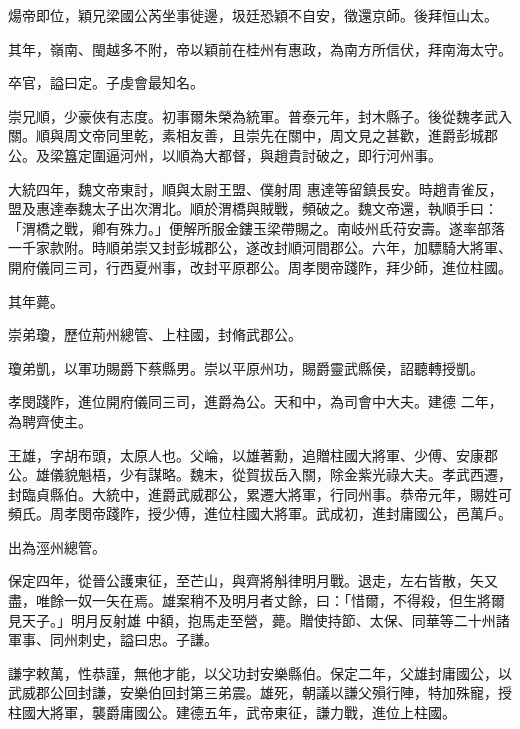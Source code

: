 \begin{pinyinscope}
 煬帝即位，穎兄梁國公芮坐事徙邊，圾廷恐穎不自安，徵還京師。後拜恒山太。



 其年，嶺南、閩越多不附，帝以穎前在桂州有惠政，為南方所信伏，拜南海太守。



 卒官，謚曰定。子虔會最知名。



 崇兄順，少豪俠有志度。初事爾朱榮為統軍。普泰元年，封木縣子。後從魏孝武入關。順與周文帝同里乾，素相友善，且崇先在關中，周文見之甚歡，進爵彭城郡公。及梁簋定圍逼河州，以順為大都督，與趙貴討破之，即行河州事。



 大統四年，魏文帝東討，順與太尉王盟、僕射周
 惠達等留鎮長安。時趙青雀反，盟及惠達奉魏太子出次渭北。順於渭橋與賊戰，頻破之。魏文帝還，執順手曰：「渭橋之戰，卿有殊力。」便解所服金鏤玉梁帶賜之。南岐州氐苻安壽。遂率部落一千家款附。時順弟崇又封彭城郡公，遂改封順河間郡公。六年，加驃騎大將軍、開府儀同三司，行西夏州事，改封平原郡公。周孝閔帝踐阼，拜少師，進位柱國。



 其年薨。



 崇弟瓊，歷位荊州總管、上柱國，封脩武郡公。



 瓊弟凱，以軍功賜爵下蔡縣男。崇以平原州功，賜爵靈武縣侯，詔聽轉授凱。



 孝閔踐阼，進位開府儀同三司，進爵為公。天和中，為司會中大夫。建德
 二年，為聘齊使主。



 王雄，字胡布頭，太原人也。父崘，以雄著勳，追贈柱國大將軍、少傅、安康郡公。雄儀貌魁梧，少有謀略。魏末，從賀拔岳入關，除金紫光祿大夫。孝武西遷，封臨貞縣伯。大統中，進爵武威郡公，累遷大將軍，行同州事。恭帝元年，賜姓可頻氏。周孝閔帝踐阼，授少傅，進位柱國大將軍。武成初，進封庸國公，邑萬戶。



 出為涇州總管。



 保定四年，從晉公護東征，至芒山，與齊將斛律明月戰。退走，左右皆散，矢又盡，唯餘一奴一矢在焉。雄案稍不及明月者丈餘，曰：「惜爾，不得殺，但生將爾見天子。」明月反射雄
 中額，抱馬走至營，薨。贈使持節、太保、同華等二十州諸軍事、同州刺史，謚曰忠。子謙。



 謙字敕萬，性恭謹，無他才能，以父功封安樂縣伯。保定二年，父雄封庸國公，以武威郡公回封謙，安樂伯回封第三弟震。雄死，朝議以謙父殞行陣，特加殊寵，授柱國大將軍，襲爵庸國公。建德五年，武帝東征，謙力戰，進位上柱國。




\end{pinyinscope}
